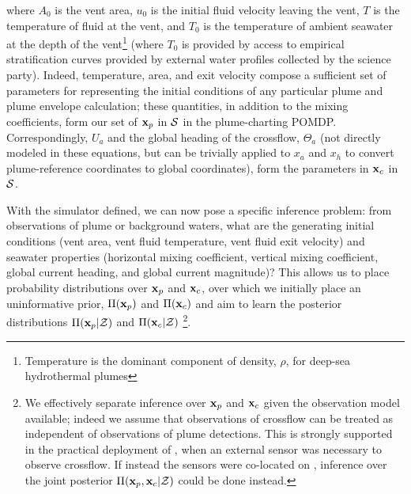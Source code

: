 \noindent where $A_0$ is the vent area, $u_0$ is the initial fluid velocity leaving the vent, $T$ is the temperature of fluid at the vent, and $T_0$ is the temperature of ambient seawater at the depth of the vent\footnote{Temperature is the dominant component of density, $\rho$, for deep-sea hydrothermal plumes} (where $T_0$ is provided by access to empirical stratification curves provided by external water profiles collected by the science party). Indeed, temperature, area, and exit velocity compose a sufficient set of parameters for representing the initial conditions of any particular plume and plume envelope calculation; these quantities, in addition to the mixing coefficients, form our set of $\mathbf{x}_p$ in $\mathcal{S}$ in the plume-charting POMDP. Correspondingly, $U_a$ and the global heading of the crossflow, $\Theta_a$ (not directly modeled in these equations, but can be trivially applied to $x_a$ and $x_h$ to convert plume-reference coordinates to global coordinates), form the parameters in $\mathbf{x}_c$ in $\mathcal{S}$.

With the simulator defined, we can now pose a specific inference problem: from observations of plume or background waters, what are the generating initial conditions (vent area, vent fluid temperature, vent fluid exit velocity) and seawater properties (horizontal mixing coefficient, vertical mixing coefficient, global current heading, and global current magnitude)? This allows us to place probability distributions over $\mathbf{x}_p$ and $\mathbf{x}_c$, over which we initially place an uninformative prior, $\Pi(\mathbf{x}_p)$ and $\Pi(\mathbf{x}_c)$ and aim to learn the posterior distributions $\Pi(\mathbf{x}_p | \mathcal{Z})$ and $\Pi(\mathbf{x}_c | \mathcal{Z})$ \footnote{We effectively separate inference over $\mathbf{x}_p$ and $\mathbf{x}_c$ given the observation model available; indeed we assume that observations of crossflow can be treated as independent of observations of plume detections. This is strongly supported in the practical deployment of \Sentry, when an external sensor was necessary to observe crossflow. If instead the sensors were co-located on \Sentry, inference over the joint posterior $\Pi(\mathbf{x}_p, \mathbf{x}_c | \mathcal{Z})$ could be done instead.}.

